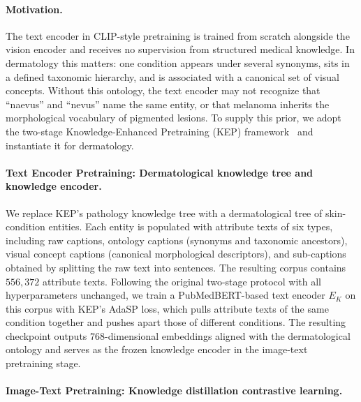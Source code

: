 \documentclass{article}
\begin{document}
\paragraph{Motivation.}
The text encoder in CLIP-style pretraining is trained from scratch alongside the vision encoder and receives no supervision from structured medical knowledge. In dermatology this matters: one condition appears under several synonyms, sits in a defined taxonomic hierarchy, and is associated with a canonical set of visual concepts. Without this ontology, the text encoder may not recognize that ``naevus'' and ``nevus'' name the same entity, or that melanoma inherits the morphological vocabulary of pigmented lesions. To supply this prior, we adopt the two-stage Knowledge-Enhanced Pretraining (KEP) framework~\cite{KEP} and instantiate it for dermatology.

\paragraph{Text Encoder Pretraining: Dermatological knowledge tree and knowledge encoder.}
We replace KEP's pathology knowledge tree with a dermatological tree of skin-condition entities. Each entity is populated with attribute texts of six types, including raw captions, ontology captions (synonyms and taxonomic ancestors), visual concept captions (canonical morphological descriptors), and sub-captions obtained by splitting the raw text into sentences. The resulting corpus contains $556{,}372$ attribute texts. Following the original two-stage protocol with all hyperparameters unchanged, we train a PubMedBERT-based text encoder $E_K$ on this corpus with KEP's AdaSP loss, which pulls attribute texts of the same condition together and pushes apart those of different conditions. The resulting checkpoint outputs $768$-dimensional embeddings aligned with the dermatological ontology and serves as the frozen knowledge encoder in the image-text pretraining stage.

\paragraph{Image-Text Pretraining: Knowledge distillation contrastive learning.}
\end{document}
